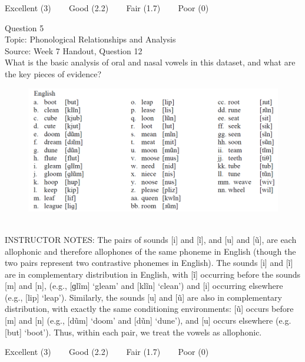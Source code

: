 \documentclass[12pt]{article}
\begin{document}
\vfill
Excellent (3) ~~~ Good (2.2) ~~~ Fair (1.7) ~~~ Poor (0)
\newpage

{\large Question 5}\\

Topic: Phonological Relationships and Analysis\\
Source: Week 7 Handout, Question 12\\

What is the basic analysis of oral and nasal vowels in this dataset, and what are the key pieces of evidence?\\

\begin{figure}[H]
\includegraphics{../images/english12.png}
\end{figure}

~\\
INSTRUCTOR NOTES: The pairs of sounds [i] and [ĩ], and [u] and [ũ], are each allophonic and therefore allophones of the same phoneme in English (though the two pairs represent two contrastive phonemes in English). The sounds [i] and [ĩ] are in complementary distribution in English, with [ĩ] occurring before the sounds [m] and [n], (e.g., [ɡlĩm] ‘gleam’ and [klĩn] ‘clean’) and [i] occurring elsewhere (e.g., [lip] ‘leap’). Similarly, the sounds [u] and [ũ] are also in complementary distribution, with exactly the same conditioning environments: [ũ] occurs before [m] and [n] (e.g., [dũm] ‘doom’ and [dũn] ‘dune’), and [u] occurs elsewhere (e.g. [but] ‘boot’). Thus, within each pair, we treat the vowels as allophonic. 


\vfill
Excellent (3) ~~~ Good (2.2) ~~~ Fair (1.7) ~~~ Poor (0)
\newpage

\begin{center}
\textbf{{\color{red}{\HUGE END OF EXAM}}}\\

\end{center}
\newpage
\end{document}

